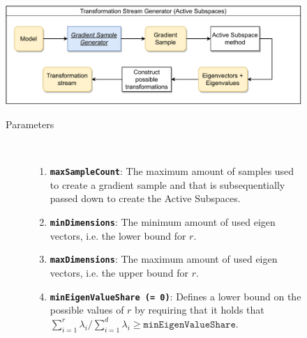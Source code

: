 \documentclass[
  a4paper,  %
  twoside,  %
  bibliography=totoc,
  headsepline,
  cleardoublepage=empty,
  parskip=half,
  draft=false
]{scrbook}
\begin{document}
\begin{figure}[H]

\includegraphics[width=\textwidth]{graphics/TransformationStreamGen_AS.pdf}

\vspace{-1.5mm}

\begin{mdframed}[linewidth=0.7px]

\begin{description}
\item[Parameters] {~ \begin{enumerate}[\indent{}]
\item \texttt{\textbf{maxSampleCount}}: The maximum amount of samples used to create a gradient sample and that is subsequentially passed down to create the Active Subspaces.
\item \texttt{\textbf{minDimensions}}: The minimum amount of used eigen vectors, i.e. the lower bound for $r$.
\item \texttt{\textbf{maxDimensions}}: The maximum amount of used eigen vectors, i.e. the upper bound for $r$.
\item \texttt{\textbf{minEigenValueShare (= 0)}}: Defines a lower bound on the possible values of $r$ by requiring that it holds that $\sum_{i=1}^r \lambda_i / \sum_{i=1}^d \lambda_i \geq \texttt{minEigenValueShare}$.
\end{enumerate}}
\end{description}

\end{mdframed}
\label{fig:astsg}
\end{figure}
\end{document}
